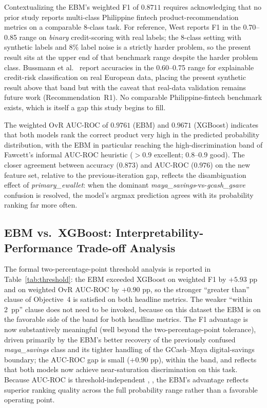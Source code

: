 \documentclass{icsthesis}
\begin{document}
\begin{mainmatter}
					Contextualizing the EBM's weighted F1 of $0.8711$ requires acknowledging that no prior study reports multi-class Philippine fintech product-recommendation metrics on a comparable 8-class task. For reference, West \cite{ref56} reports F1 in the 0.70--0.85 range on \emph{binary} credit-scoring with real labels; the 8-class setting with synthetic labels and 8\% label noise is a strictly harder problem, so the present result sits at the upper end of that benchmark range despite the harder problem class. Bussmann et al.\ \cite{ref14} report accuracies in the 0.60--0.75 range for explainable credit-risk classification on real European data, placing the present synthetic result above that band but with the caveat that real-data validation remains future work (Recommendation~R1). No comparable Philippine-fintech benchmark exists, which is itself a gap this study begins to fill.

					The weighted OvR AUC-ROC of $0.9761$ (EBM) and $0.9671$ (XGBoost) indicates that both models rank the correct product very high in the predicted probability distribution, with the EBM in particular reaching the high-discrimination band of Fawcett's \cite{ref81} informal AUC-ROC heuristic ($>0.9$ excellent; $0.8$--$0.9$ good). The closer agreement between accuracy ($0.873$) and AUC-ROC ($0.976$) on the new feature set, relative to the previous-iteration gap, reflects the disambiguation effect of \emph{primary\_ewallet}: when the dominant \emph{maya\_savings}-vs-\emph{gcash\_gsave} confusion is resolved, the model's argmax prediction agrees with its probability ranking far more often.

			\subsection{EBM vs.\ XGBoost: Interpretability-Performance Trade-off Analysis}
				The formal two-percentage-point threshold analysis is reported in Table~\ref{tab:threshold}: the EBM exceeded XGBoost on weighted F1 by $+5.93$ pp and on weighted OvR AUC-ROC by $+0.90$ pp, so the stronger ``greater than'' clause of Objective~4 is satisfied on both headline metrics. The weaker ``within 2~pp'' clause does not need to be invoked, because on this dataset the EBM is on the favorable side of the band for both headline metrics. The F1 advantage is now substantively meaningful (well beyond the two-percentage-point tolerance), driven primarily by the EBM's better recovery of the previously confused \emph{maya\_savings} class and its tighter handling of the GCash--Maya digital-savings boundary; the AUC-ROC gap is small ($+0.90$ pp), within the band, and reflects that both models now achieve near-saturation discrimination on this task. Because AUC-ROC is threshold-independent \cite{ref81}, \cite{ref82}, the EBM's advantage reflects superior ranking quality across the full probability range rather than a favorable operating point.


\end{mainmatter}
\end{document}
